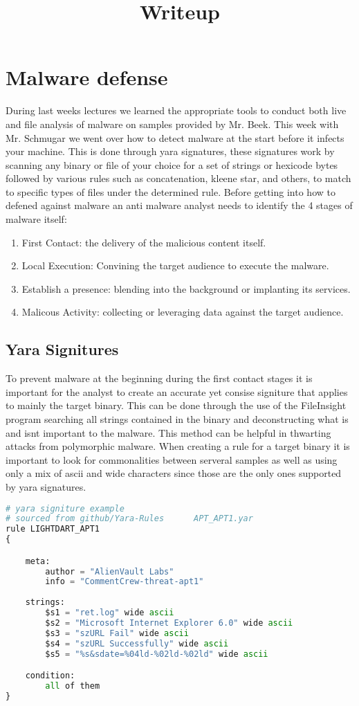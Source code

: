 \documentclass[letterpaper,12pt,titlepage,onecolumn]{IEEEtran}
\author{\name}
\title{Writeup}
\begin{document}
\maketitle
\hrulefill

\section{Malware defense}
During last weeks lectures we learned the appropriate tools to conduct both live and file analysis of malware on samples provided by Mr. Beek. This week with Mr. Schmugar we went over how to detect malware at the start before it infects your machine. This is done through yara signatures, these signatures work by scanning any binary or file of your choice for a set of strings or hexicode bytes followed by various rules such as concatenation, kleene star, and others, to match to specific types of files under the determined rule. Before getting into how to defened against malware an anti malware analyst needs to identify the 4 stages of malware itself:
\begin{enumerate}
    \item First Contact: the delivery of the malicious content itself.
    \item Local Execution: Convining the target audience to execute the malware.
    \item Establish a presence: blending into the background or implanting its services.
    \item Malicous Activity: collecting or leveraging data against the target audience.
\end{enumerate}

\subsection{Yara Signitures}
To prevent malware at the beginning during the first contact stages it is important for the analyst to create an accurate yet consise signiture that applies to mainly the target binary. This can be done through the use of the FileInsight program searching all strings contained in the binary and deconstructing what is and isnt important to the malware. This method can be helpful in thwarting attacks from polymorphic malware. When creating a rule for a target binary it is important to look for commonalities between serveral samples as well as using only a mix of ascii and wide characters since those are the only ones supported by yara signatures.
\begin{lstlisting}[language=Python]
# yara signiture example
# sourced from github/Yara-Rules      APT_APT1.yar
rule LIGHTDART_APT1
{

    meta:
        author = "AlienVault Labs"
        info = "CommentCrew-threat-apt1"
        
    strings:
        $s1 = "ret.log" wide ascii
        $s2 = "Microsoft Internet Explorer 6.0" wide ascii
        $s3 = "szURL Fail" wide ascii
        $s4 = "szURL Successfully" wide ascii
        $s5 = "%s&sdate=%04ld-%02ld-%02ld" wide ascii

    condition:
        all of them
}
\end{lstlisting}
\end{document}
